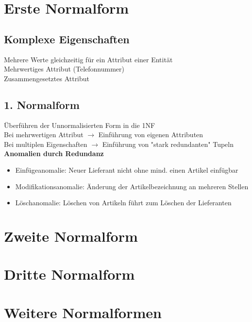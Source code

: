 \documentclass{scrreprt}
\begin{document}
\section{Erste Normalform}
\subsection{Komplexe Eigenschaften}
Mehrere Werte gleichzeitig für ein Attribut einer Entität
\\Mehrwertiges Attribut (Telefonnummer)
\\Zusammengesetztes Attribut
\subsection{1. Normalform}
Überführen der Unnormalisierten Form in die 1NF
\\Bei mehrwertigen Attribut $\rightarrow$ Einführung von eigenen Attributen
\\Bei multiplen Eigenschaften $\rightarrow$ Einführung von "stark redundanten" Tupeln
\\\textbf{Anomalien durch Redundanz}
\begin{itemize}
  \item Einfügeanomalie: Neuer Lieferant nicht ohne mind. einen Artikel einfügbar
  \item Modifikationsanomalie: Änderung der Artikelbezeichnung an mehreren Stellen
  \item Löschanomalie: Löschen von Artikeln führt zum Löschen der Lieferanten
\end{itemize}
\section{Zweite Normalform}
\section{Dritte Normalform}
\section{Weitere Normalformen}
\end{document}
